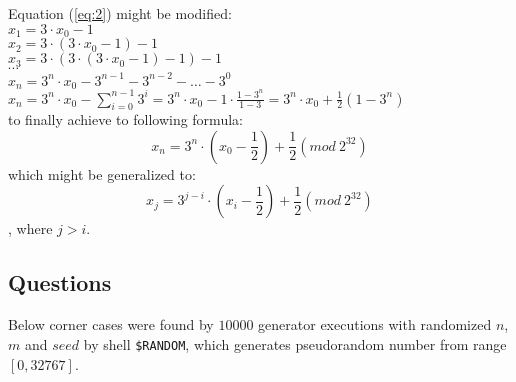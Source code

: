 \documentclass[a4paper,10pt]{article}
\begin{document}
Equation (\ref{eq:2}) might be modified: \\
 $x_1 = 3 \cdot x_0 -1$ \\
 $x_2 = 3 \cdot (3 \cdot x_0 - 1) -1$ \\
 $x_3 = 3 \cdot (3 \cdot (3 \cdot x_0 -1) - 1) -1$ \\
 $\cdots$ \\
 $x_n = 3^n \cdot x_0 - 3^{n-1} - 3^{n-2} - \ldots - 3^0$ \\
 $x_n = 3^n \cdot x_0 - \sum_{i=0}^{n-1} 3^i = 3^n \cdot x_0 - 1 \cdot \frac{1-3^n}{1-3} = 3^n \cdot x_0 + \frac{1}{2}(1-3^n)$ \\
 to finally achieve to following formula:
\begin{equation}
 \label{eq:22}
 x_n = 3^n \cdot (x_0 - \frac{1}{2}) + \frac{1}{2} (mod\ 2^{32})
 \end{equation}
which might be generalized to:
\begin{equation}
 \label{eq:23}
 x_j = 3^{j-i} \cdot (x_i - \frac{1}{2}) + \frac{1}{2} (mod\ 2^{32})
 \end{equation}
 , where $j>i$.

 
\subsection{Questions}
Below corner cases were found by $10000$ generator executions with randomized $n$, $m$ and $seed$ by shell \texttt{\$RANDOM}, which generates pseudorandom number from range $[0,32767]$.
\\
\end{document}
